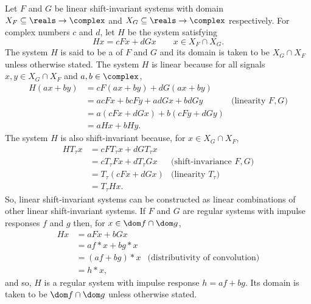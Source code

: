 Let $F$ and $G$ be linear shift-invariant systems with domain $X_F \subseteq \reals \to \complex$ and $X_G \subseteq \reals \to \complex$ respectively.  For complex numbers $c$ and $d$, let $H$ be the system satisfying
\[
Hx = cFx + dGx \qquad x \in X_F \cap X_G.
\]
The system $H$ is said to be a  of $F$ and $G$ and its domain is taken to be $X_G \cap X_F$ unless otherwise stated.  The system $H$ is linear because for all signals $x,y \in X_G \cap X_F$ and $a,b \in \complex$,
\begin{align*}
H(ax + by) &= cF(ax+by) + dG(ax+by) \\
&= acF x +bcFy + adGx+ bdGy & \text{(linearity $F, G$)} \\
&= a ( cFx  + dGx ) + b ( cFy + dGy ) \\
&= aHx + bHy.
\end{align*}
The system $H$ is also shift-invariant because, for $x \in X_G \cap X_F$,
\begin{align*}
HT_\tau x &= cFT_\tau x + dGT_\tau x  \\
&= c T_\tau F x + dT_\tau G x & \text{(shift-invariance $F,G$)} \\
&= T_\tau( cF x + dG x ) & \text{(linearity $T_\tau$)} \\
&= T_\tau H x.
\end{align*}
So, linear shift-invariant systems can be constructed as linear combinations of other linear shift-invariant systems.  If $F$ and $G$ are regular systems with impulse responses $f$ and $g$ then, for $x \in \dom f \cap \dom g$,
\begin{align*}
Hx &= a F x + b G x \\
&= a f * x + b g * x \\
&= (a f + bg) * x &\text{(distributivity of convolution)}\\
&= h * x,
\end{align*}
and so, $H$ is a regular system with impulse response $h = af + bg$.  Its domain is taken to be $\dom f \cap \dom g$ unless otherwise stated.  %

